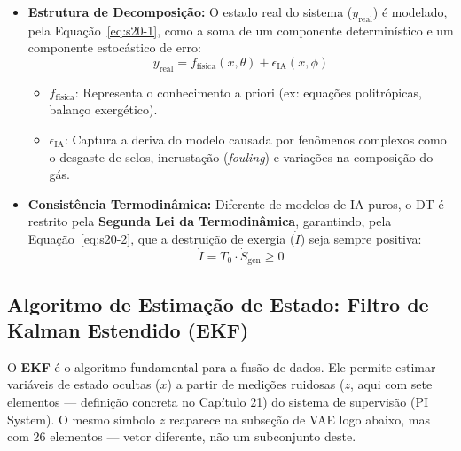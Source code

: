 \documentclass[12pt,a4paper]{article}
\numberwithin{equation}{section}
\numberwithin{table}{section}
\numberwithin{figure}{section}
\begin{document}
{	\begin{itemize}
		\item \textbf{Estrutura de Decomposição:}
		O estado real do sistema ($y_{\text{real}}$) é modelado, pela Equação~\eqref{eq:s20-1}, como a soma de um componente determinístico e um componente estocástico de erro:
		\begin{equation}\label{eq:s20-1}
 y_{\text{real}} = f_{\text{física}}(x, \theta) + \epsilon_{\text{IA}}(x, \phi) 
\end{equation}
		\begin{itemize}
			\item $f_{\text{física}}$: Representa o conhecimento a priori (ex: equações politrópicas, balanço exergético).
			\item $\epsilon_{\text{IA}}$: Captura a deriva do modelo causada por fenômenos complexos como o desgaste de selos, incrustação (\textit{fouling}) e variações na composição do gás.
		\end{itemize}
		
		\item \textbf{Consistência Termodinâmica:}
		Diferente de modelos de IA puros, o DT é restrito pela \textbf{Segunda Lei da Termodinâmica}, garantindo, pela Equação~\eqref{eq:s20-2}, que a destruição de exergia ($\dot{I}$) seja sempre positiva:
		\begin{equation}\label{eq:s20-2}
 \dot{I} = T_0 \cdotp \dot{S}_{\text{gen}} \ge 0 
\end{equation}
	\end{itemize}
	
	\subsection{Algoritmo de Estimação de Estado: Filtro de Kalman Estendido (EKF)}
	
	O \textbf{EKF} é o algoritmo fundamental para a fusão de dados. Ele permite estimar variáveis de estado ocultas ($x$) a partir de medições ruidosas ($z$, aqui com sete elementos — definição concreta no Capítulo 21) do sistema de supervisão (PI System). O mesmo símbolo $z$ reaparece na subseção de VAE logo abaixo, mas com 26 elementos — vetor diferente, não um subconjunto deste.
	
}
\end{document}
